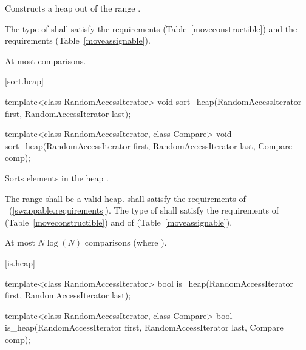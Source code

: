 \begin{itemdescr}
\pnum
\effects
Constructs a heap out of the range
.

\pnum
\requires The type of  shall satisfy
the  requirements
(Table~\ref{moveconstructible}) and the
 requirements
(Table~\ref{moveassignable}).

\pnum
\complexity
At most
comparisons.
\end{itemdescr}

[sort.heap]{}

%
\begin{itemdecl}
template<class RandomAccessIterator>
  void sort_heap(RandomAccessIterator first, RandomAccessIterator last);

template<class RandomAccessIterator, class Compare>
  void sort_heap(RandomAccessIterator first, RandomAccessIterator last,
                 Compare comp);
\end{itemdecl}

\begin{itemdescr}
\pnum
\effects
Sorts elements in the heap
.

\pnum
\requires The range  shall be a valid heap.
 shall satisfy the requirements of
~(\ref{swappable.requirements}). The type
of  shall satisfy the requirements of
 (Table~\ref{moveconstructible}) and of
 (Table~\ref{moveassignable}).


\pnum
\complexity
At most $N \log(N)$
comparisons (where
).
\end{itemdescr}

[is.heap]{}

%
\begin{itemdecl}
template<class RandomAccessIterator>
  bool is_heap(RandomAccessIterator first, RandomAccessIterator last);
\end{itemdecl}


\begin{itemdescr}
\pnum
\returns {}
\end{itemdescr}

%
\begin{itemdecl}
template<class RandomAccessIterator, class Compare>
  bool is_heap(RandomAccessIterator first, RandomAccessIterator last, Compare comp);
\end{itemdecl}


